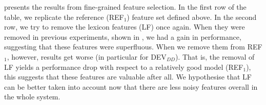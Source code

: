\documentclass[output=paper,
modfonts
]{langscibook}
\begin{document}
 presents the results from fine-grained feature selection.
In the first row of the table, we replicate the reference (\textsc{REF$_1$}) feature set defined above.
In the second row, we try to remove the lexicon features (\textsc{LF}) once again. When they were removed in previous experiments, shown in , we had a gain in performance, suggesting that these features were superfluous. When we remove them from \textsc{REF$_1$}, however, results get worse (in particular for \textsc{DEV}$_{DD}$). That is, the removal of \textsc{LF} yields a performance drop with respect to a relatively good model (\textsc{REF$_1$}), this suggests that these features are valuable after all. We hypothesise that \textsc{LF} can be better taken into account now that there are less noisy features overall in the whole system.
\end{document}
